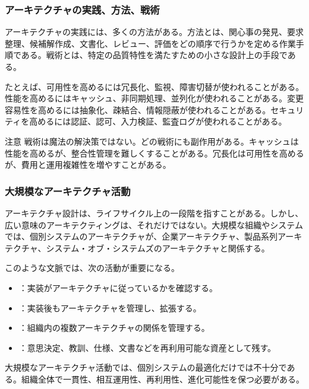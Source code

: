 \documentclass[a4paper,11pt]{ltjsarticle}
\numberwithin{figure}{section}
\numberwithin{table}{section}
\begin{document}
\subsubsection{アーキテクチャの実践、方法、戦術}
アーキテクチャの実践には、多くの方法がある。方法とは、関心事の発見、要求整理、候補解作成、文書化、レビュー、評価をどの順序で行うかを定める作業手順である。戦術とは、特定の品質特性を満たすための小さな設計上の手段である。

たとえば、可用性を高めるには冗長化、監視、障害切替が使われることがある。性能を高めるにはキャッシュ、非同期処理、並列化が使われることがある。変更容易性を高めるには抽象化、疎結合、情報隠蔽が使われることがある。セキュリティを高めるには認証、認可、入力検証、監査ログが使われることがある。

\begin{statementbox}{注意}
戦術は魔法の解決策ではない。どの戦術にも副作用がある。キャッシュは性能を高めるが、整合性管理を難しくすることがある。冗長化は可用性を高めるが、費用と運用複雑性を増やすことがある。
\end{statementbox}

\subsubsection{大規模なアーキテクチャ活動}
アーキテクチャ設計は、ライフサイクル上の一段階を指すことがある。しかし、広い意味のアーキテクティングは、それだけではない。大規模な組織やシステムでは、個別システムのアーキテクチャが、企業アーキテクチャ、製品系列アーキテクチャ、システム・オブ・システムズのアーキテクチャと関係する。

このような文脈では、次の活動が重要になる。
\begin{itemize}
  \item {}：実装がアーキテクチャに従っているかを確認する。
  \item {}：実装後もアーキテクチャを管理し、拡張する。
  \item {}：組織内の複数アーキテクチャの関係を管理する。
  \item {}：意思決定、教訓、仕様、文書などを再利用可能な資産として残す。
\end{itemize}

大規模なアーキテクチャ活動では、個別システムの最適化だけでは不十分である。組織全体で一貫性、相互運用性、再利用性、進化可能性を保つ必要がある。
\end{document}
